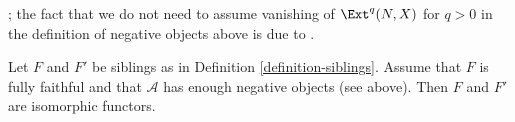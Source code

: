 %

\begin{proposition}
\label{proposition-siblings-isomorphic}
\begin{reference}
\cite[Proposition 2.16]{Orlov-K3}; the fact that we do not need
to assume vanishing of $\Ext^q(N, X)$ for $q > 0$ in the definition
of negative objects above is due to \cite{Canonaco-Stellari}.
\end{reference}
Let $F$ and $F'$ be siblings as in Definition \ref{definition-siblings}.
Assume that $F$ is fully faithful and that $\mathcal{A}$ has enough
negative objects (see above). Then $F$ and $F'$ are isomorphic functors.
\end{proposition}

